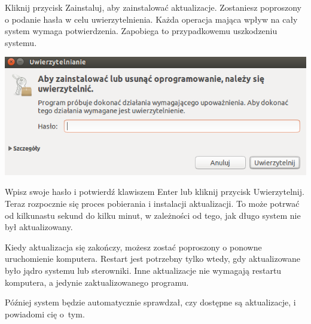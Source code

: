 Kliknij przycisk \textcolor{ubuntu_orange}{Zainstaluj}, aby zainstalować aktualizacje. Zostaniesz poproszony o podanie hasła w celu uwierzytelnienia. Każda operacja mająca wpływ na cały system wymaga potwierdzenia. Zapobiega to przypadkowemu uszkodzeniu systemu.

\begin{center}
	\includegraphics{images/unity_uwierzytelnienie.png}
\end{center}

Wpisz swoje hasło i potwierdź klawiszem Enter lub kliknij przycisk \textcolor{ubuntu_orange}{Uwierzytelnij}. Teraz rozpocznie się proces pobierania i instalacji aktualizacji. To może potrwać od kilkunastu sekund do kilku minut, w zależności od tego, jak długo system nie był aktualizowany.

Kiedy aktualizacja się zakończy, możesz zostać poproszony o ponowne uruchomienie komputera. Restart jest potrzebny tylko wtedy, gdy aktualizowane było jądro systemu lub sterowniki. Inne aktualizacje nie wymagają restartu komputera, a jedynie zaktualizowanego programu.

Później system będzie automatycznie sprawdzał, czy dostępne są aktualizacje, i powiadomi cię o~tym.
\clearpage
